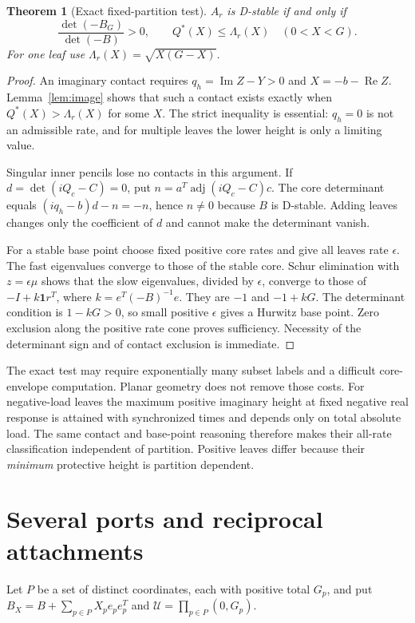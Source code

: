 \documentclass[11pt]{article}
\newtheorem{theorem}{Theorem}[section]
\theoremstyle{remark}\newtheorem{remark}[theorem]{Remark}
\newcommand{\Rea}{\operatorname{Re}}\newcommand{\Ima}{\operatorname{Im}}
\begin{document}
\begin{theorem}[Exact fixed-partition test]\label{thm:partition}
$A_r$ is D-stable if and only if
\begin{equation}\label{eq:partitiontest}
 \frac{\det(-B_G)}{\det(-B)}>0,
 \qquad Q^*(X)\le\Lambda_r(X)\quad(0<X<G).
\end{equation}
For one leaf use $\Lambda_r(X)=\sqrt{X(G-X)}$.
\end{theorem}
\begin{proof}
An imaginary contact requires $q_h=\Ima Z-Y>0$ and
$X=-b-\Rea Z$. Lemma~\ref{lem:image} shows that such a contact exists
exactly when $Q^*(X)>\Lambda_r(X)$ for some $X$.
The strict inequality is essential: $q_h=0$ is not an admissible rate,
and for multiple leaves the lower height is only a limiting value.

Singular inner pencils lose no contacts in this argument. If
$d=\det(iQ_c-C)=0$, put $n=a^T\operatorname{adj}(iQ_c-C)c$.
The core determinant equals $(iq_h-b)d-n=-n$, hence $n\ne0$ because
$B$ is D-stable. Adding leaves changes only the coefficient of $d$ and
cannot make the determinant vanish.

For a stable base point choose fixed positive core rates and give all
leaves rate $\epsilon$. The fast eigenvalues converge to those of the
stable core. Schur elimination with $z=\epsilon\mu$ shows that the slow
eigenvalues, divided by $\epsilon$, converge to
those of $-I+k\mathbf1r^T$, where $k=e^T(-B)^{-1}e$.
They are $-1$ and $-1+kG$. The determinant condition is $1-kG>0$,
so small positive $\epsilon$ gives a Hurwitz base point. Zero exclusion
along the positive rate cone proves sufficiency. Necessity of the
determinant sign and of contact exclusion is immediate.
\end{proof}

The exact test may require exponentially many subset labels and a difficult
core-envelope computation. Planar geometry does not remove those costs.
For negative-load leaves the maximum positive imaginary height at fixed
negative real response is attained with synchronized times and depends
only on total absolute load. The same contact and base-point reasoning
therefore makes their all-rate classification independent of partition.
Positive leaves differ because their \emph{minimum} protective height is
partition dependent.

\section{Several ports and reciprocal attachments}
Let $P$ be a set of distinct coordinates, each with positive total $G_p$,
and put $B_X=B+\sum_{p\in P}X_pe_pe_p^T$ and
$\mathcal U=\prod_{p\in P}(0,G_p)$.
\end{document}
